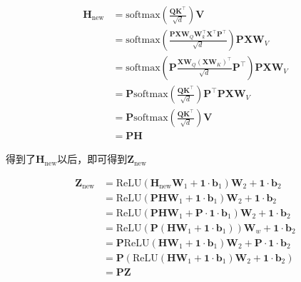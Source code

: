 \begin{parts}
\begin{subparts}
{        \begin{align*}
            \mathbf{H}_{\text{new}} &= \text{softmax}(\frac{\mathbf{Q} \mathbf{K}^\top}{\sqrt{d}}) \mathbf{V} \\
            &= \text{softmax}(\frac{\mathbf{P} \mathbf{X} \mathbf{W}_{Q} \mathbf{W}_{k}^\top \mathbf{X}^\top \mathbf{P}^\top}{\sqrt{d}}) \mathbf{P} \mathbf{X} \mathbf{W}_{V} \\
            &= \text{softmax}(\mathbf{P} \frac{\mathbf{X} \mathbf{W}_{Q} (\mathbf{X} \mathbf{W}_{K})^\top}{\sqrt{d}} \mathbf{P}^\top) \mathbf{P} \mathbf{X} \mathbf{W}_{V} \\
            &= \mathbf{P} \text{softmax}(\frac{\mathbf{Q} \mathbf{K}^\top}{\sqrt{d}}) \mathbf{P}^\top \mathbf{P} \mathbf{X} \mathbf{W}_{V} \\
            &= \mathbf{P} \text{softmax}(\frac{\mathbf{Q} \mathbf{K}^\top}{\sqrt{d}}) \mathbf{V} \\
            &= \mathbf{P} \mathbf{H}
        \end{align*}

        得到了$\mathbf{H}_{\text{new}}$以后，即可得到$\mathbf{Z}_{\text{new}}$

        \begin{align*}
            \mathbf{Z}_{\text{new}} &= \text{ReLU}(\mathbf{H}_{\text{new}} \mathbf{W}_{1} + \mathbf{1} \cdot \mathbf{b}_{1}) \mathbf{W}_{2} + \mathbf{1} \cdot \mathbf{b}_{2} \\
            &= \text{ReLU}(\mathbf{P} \mathbf{H} \mathbf{W}_{1} + \mathbf{1} \cdot \mathbf{b}_{1}) \mathbf{W}_{2} + \mathbf{1} \cdot \mathbf{b}_{2} \\
            &= \text{ReLU}(\mathbf{P} \mathbf{H} \mathbf{W}_{1} + \mathbf{P} \cdot \mathbf{1} \cdot \mathbf{b}_{1}) \mathbf{W}_{2} + \mathbf{1} \cdot \mathbf{b}_{2} \\
            &= \text{ReLU}(\mathbf{P}(\mathbf{H} \mathbf{W}_{1} + \mathbf{1} \cdot \mathbf{b}_{1})) \mathbf{W}_{w} + \mathbf{1} \cdot \mathbf{b}_{2} \\
            &= \mathbf{P} \text{ReLU}(\mathbf{H} \mathbf{W}_{1} + \mathbf{1} \cdot \mathbf{b}_{1}) \mathbf{W}_{2} + \mathbf{P} \cdot \mathbf{1} \cdot \mathbf{b}_{2} \\
            &= \mathbf{P}(\text{ReLU}(\mathbf{H} \mathbf{W}_{1} + \mathbf{1} \cdot \mathbf{b}_{1}) \mathbf{W}_{2} + \mathbf{1} \cdot \mathbf{b}_{2}) \\
            &= \mathbf{P} \mathbf{Z}
        \end{align*}

}
\end{subparts}
\end{parts}

